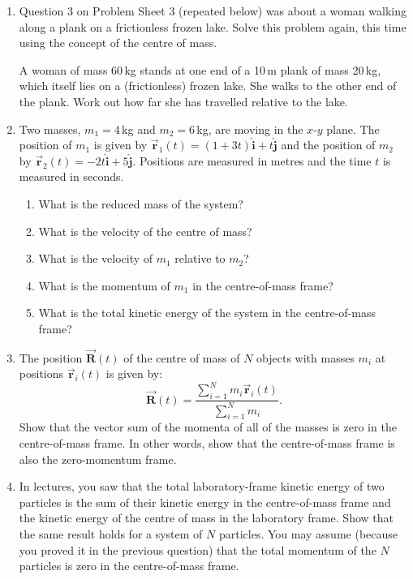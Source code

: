 \documentclass[12pt]{article}
\begin{document}
\begin{enumerate}
\item Question 3 on Problem Sheet 3 (repeated below) was about a woman
  walking along a plank on a frictionless frozen lake. Solve this
  problem again, this time using the concept of the centre of mass.

    A woman of mass 60\,kg stands at one end of a 10\,m plank of
    mass 20\,kg, which itself lies on a (frictionless) frozen lake. She
    walks to the other end of the plank. Work out how far she has
    travelled relative to the lake.

\item Two masses, $m_1 = 4\,$kg and $m_2 = 6\,$kg, are moving in the
  $x$-$y$ plane. The position of $m_1$ is given by
  $\vec{\boldsymbol{r}}_1(t) = (1 + 3t)\boldsymbol{\hat{i}} + t\boldsymbol{\hat{j}}$ and the position of $m_2$ by
  $\vec{\boldsymbol{r}}_2(t) = -2t\boldsymbol{\hat{i}} + 5\boldsymbol{\hat{j}}$. Positions are measured in metres and
  the time $t$ is measured in seconds.
  \begin{enumerate}
  \item What is the reduced mass of the system?
  \item What is the velocity of the centre of mass?
  \item What is the velocity of $m_1$ relative to $m_2$?
  \item What is the momentum of $m_1$ in the centre-of-mass frame?
  \item What is the total kinetic energy of the system in the
    centre-of-mass frame?
  \end{enumerate}

\item The position $\vec{\boldsymbol{R}}(t)$ of the centre of mass of $N$ objects with
  masses $m_i$ at positions $\vec{\boldsymbol{r}}_i(t)$ is given by:
  \begin{displaymath}
    \vec{\boldsymbol{R}}(t) = \frac{\sum_{i=1}^{N} m_i \vec{\boldsymbol{r}}_i(t)}{\sum_{i=1}^{N} m_i} .
  \end{displaymath}
  Show that the vector sum of the momenta of all of the masses is zero
  in the centre-of-mass frame. In other words, show that the
  centre-of-mass frame is also the zero-momentum frame.
  
\item In lectures, you saw that the total laboratory-frame kinetic
  energy of two particles is the sum of their kinetic energy in the
  centre-of-mass frame and the kinetic energy of the centre of mass in
  the laboratory frame. Show that the same result holds for a system of
  $N$ particles. You may assume (because you proved it in the previous question) that the
  total momentum of the $N$ particles is zero in the centre-of-mass
  frame.


\end{enumerate}
\end{document}
